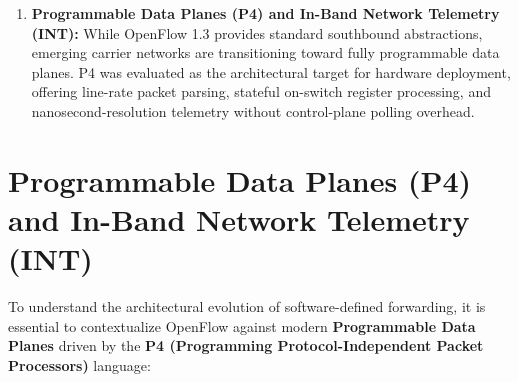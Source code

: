 \documentclass[12pt,a4paper,oneside]{report}
\begin{document}
\begin{enumerate}
    \item \textbf{Programmable Data Planes (P4) and In-Band Network Telemetry (INT):}
    While OpenFlow 1.3 provides standard southbound abstractions, emerging carrier networks are transitioning toward fully programmable data planes. P4 was evaluated as the architectural target for hardware deployment, offering line-rate packet parsing, stateful on-switch register processing, and nanosecond-resolution telemetry without control-plane polling overhead.
\end{enumerate}

\section{Programmable Data Planes (P4) and In-Band Network Telemetry (INT)}
\label{sec:p4_int_background}
To understand the architectural evolution of software-defined forwarding, it is essential to contextualize OpenFlow against modern \textbf{Programmable Data Planes} driven by the \textbf{P4 (Programming Protocol-Independent Packet Processors)} language:
\end{document}
